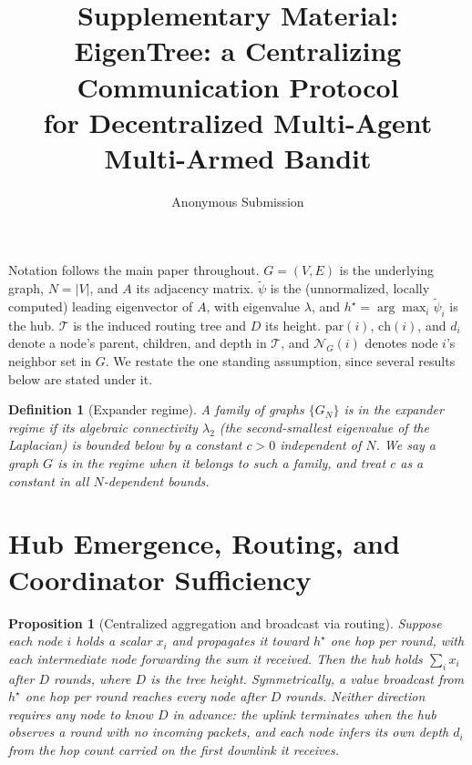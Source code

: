 \documentclass[letterpaper]{article} %
\title{Supplementary Material:\\EigenTree: a Centralizing Communication Protocol\\for Decentralized Multi-Agent Multi-Armed Bandit}
\author{
    Anonymous Submission
}
\newtheorem{proposition}{Proposition}
\newtheorem{definition}{Definition}
\begin{document}
\nocopyright

\maketitle

Notation follows the main paper throughout. $G=(V,E)$ is the underlying
graph, $N=|V|$, and $A$ its adjacency matrix. $\tilde\psi$ is the
(unnormalized, locally computed) leading eigenvector of $A$, with eigenvalue
$\lambda$, and $h^\star=\arg\max_i\tilde\psi_i$ is the hub. $\mathcal{T}$ is
the induced routing tree and $D$ its height. $\mathrm{par}(i)$, $\mathrm{ch}(i)$, and
$d_i$ denote a node's parent, children, and depth in $\mathcal{T}$, and
$\mathcal{N}_G(i)$ denotes node $i$'s neighbor set in $G$. We restate the one
standing assumption, since several results below are stated under it.

\begin{definition}[Expander regime]
\label{def:expander}
A family of graphs $\{G_N\}$ is in the expander regime if its algebraic
connectivity $\lambda_2$ (the second-smallest eigenvalue of the Laplacian) is
bounded below by a constant $c>0$ independent of $N$. We say a graph $G$ is in
the regime when it belongs to such a family, and treat $c$ as a constant in all
$N$-dependent bounds.
\end{definition}

\section{Hub Emergence, Routing, and Coordinator Sufficiency}

\begin{proposition}[Centralized aggregation and broadcast via routing]
\label{prop:aggbcast}
Suppose each node $i$ holds a scalar $x_i$ and propagates it toward
$h^\star$ one hop per round, with each intermediate node forwarding the sum
it received. Then the hub holds $\sum_i x_i$ after $D$ rounds, where $D$ is
the tree height. Symmetrically, a value broadcast from $h^\star$ one hop
per round reaches every node after $D$ rounds. Neither direction requires
any node to know $D$ in advance: the uplink terminates when the hub
observes a round with no incoming packets, and each node infers its own
depth $d_i$ from the hop count carried on the first downlink it receives.
\end{proposition}
\end{document}
